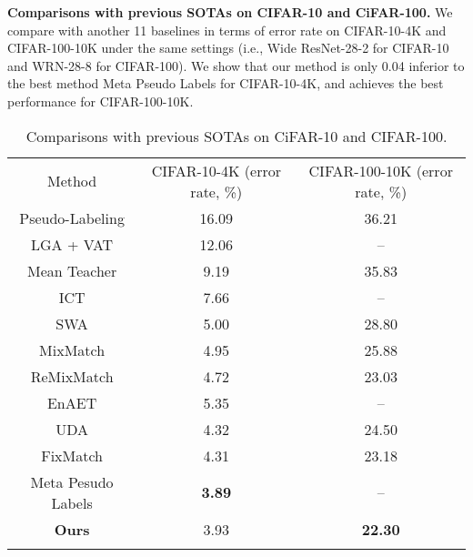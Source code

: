 \noindent \textbf{Comparisons with previous SOTAs on CIFAR-10 and CiFAR-100.}
We compare with another 11 baselines in terms of error rate on CIFAR-10-4K and CIFAR-100-10K under the same settings (i.e., Wide ResNet-28-2 for CIFAR-10 and WRN-28-8 for CIFAR-100). We show that our method is only 0.04 inferior to the best method Meta Pseudo Labels for CIFAR-10-4K, and achieves the best performance for CIFAR-100-10K.

\begin{table}[!htbp]
    \centering
    \caption{Comparisons with previous SOTAs on CiFAR-10 and CIFAR-100.}
    \setlength{\tabcolsep}{12pt}
    \renewcommand\arraystretch{1.2}
    \begin{tabular}{c|c|c}
    \shline
Method    &   CIFAR-10-4K  (error rate, \%) &   CIFAR-100-10K  (error rate, \%) \\
\shline
 Pseudo-Labeling    & 16.09               & 36.21                 \\
 LGA + VAT          & 12.06               & --                    \\
 Mean Teacher       & 9.19                & 35.83                 \\
 ICT                & 7.66                & --                    \\
 SWA                & 5.00                & 28.80                 \\
 MixMatch           & 4.95                & 25.88                 \\
 ReMixMatch         & 4.72                & 23.03                 \\
 EnAET              & 5.35            & --                    \\
 UDA                & 4.32                & 24.50                 \\
 FixMatch           & 4.31                & 23.18                 \\
 Meta Pesudo Labels & \textbf{3.89}            & --                    \\
 \hline
\textbf{Ours}           & 3.93                & \textbf{22.30}             \\
   \shline
    \end{tabular}
    \label{tab:exp2}
\end{table}


